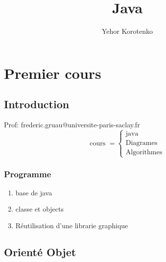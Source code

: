 \documentclass{report}
\title{\Huge{Java}}
\author{\huge{Yehor Korotenko}}
\date{}
\begin{document}
\maketitle
\newpage%
\tableofcontents
\pagebreak

\chapter{Premier cours}
\section{Introduction}
Prof: frederic.gruau@universite-paris-saclay.fr
\[
\text{cours } = \begin{cases}
    \text{java}\\
    \text{Diagrames}\\
    \text{Algorithmes}
\end{cases}
\] 
\subsection{Programme}
\begin{enumerate}
    \item base de java
    \item classe et objects
    \item Réutilisation d'une librarie graphique
\end{enumerate}
\section{Orienté Objet}
\end{document}
